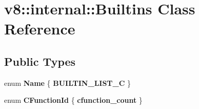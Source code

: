 \hypertarget{classv8_1_1internal_1_1_builtins}{}\section{v8\+:\+:internal\+:\+:Builtins Class Reference}
\label{classv8_1_1internal_1_1_builtins}
\subsection*{Public Types}
\begin{DoxyCompactItemize}
\item 
enum {\bfseries Name} \{ {\bfseries B\+U\+I\+L\+T\+I\+N\+\_\+\+L\+I\+S\+T\+\_\+C}
 \}\hypertarget{classv8_1_1internal_1_1_builtins_af0fa18b8b976be56ea5cba1f88a5720e}{}\label{classv8_1_1internal_1_1_builtins_af0fa18b8b976be56ea5cba1f88a5720e}

\item 
enum {\bfseries C\+Function\+Id} \{ {\bfseries cfunction\+\_\+count}
 \}\hypertarget{classv8_1_1internal_1_1_builtins_a4b8719d456ae0289285e542440d1ad9e}{}\label{classv8_1_1internal_1_1_builtins_a4b8719d456ae0289285e542440d1ad9e}

\end{DoxyCompactItemize}
